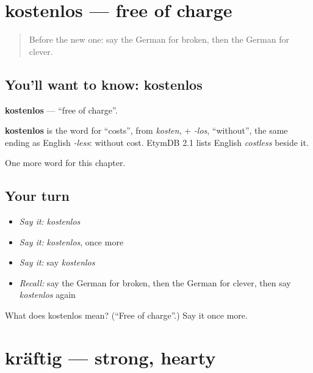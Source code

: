 \section[kostenlos]{kostenlos — free of charge}

\label{lesson:GE-C217-kostenlos}



\begin{quote}
Before the new one: say the German for broken, then the German for clever.
\end{quote}

\subsection*{You'll want to know: kostenlos}
\textbf{kostenlos} — \textquotedblleft{}free of charge\textquotedblright{}.

\begin{cousinweb}
\textbf{kostenlos} is the word for \textquotedblleft{}costs\textquotedblright{}, from \emph{kosten}, + \emph{-los}, \textquotedblleft{}without\textquotedblright{}, the same ending as English \emph{-less}: without cost. EtymDB 2.1 lists English \emph{costless} beside it.
\end{cousinweb}

\begin{grammarlens}[title={What you've built}]
One more word for this chapter.
\end{grammarlens}

\subsection*{Your turn}
\begin{itemize}
\raggedright
  \item \emph{Say it:} \emph{kostenlos}
  \item \emph{Say it:} \emph{kostenlos}, once more
  \item \emph{Say it:} say \emph{kostenlos}
  \item \emph{Recall:} say the German for broken, then the German for clever, then say \emph{kostenlos} again
\end{itemize}

\begin{tcolorbox}[breakable,colback=teal!4,colframe=teal!35!black,title={Before you move on}]
What does kostenlos mean? (\textquotedblleft{}Free of charge\textquotedblright{}.) Say it once more.
\end{tcolorbox}
\section[kräftig]{kräftig — strong, hearty}

